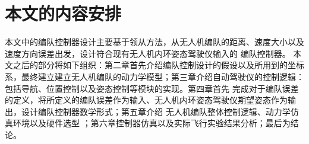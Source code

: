 \section{本文的内容安排}
本文中的编队控制器设计主要基于领从方法，从无人机编队的距离、速度大小以及速度方向误差出发，设计符合现有无人机内环姿态驾驶仪输入的
编队控制器。
本文之后的部分将如下组织：第二章首先介绍编队控制设计的假设以及所用到的坐标系，最终建立建立无人机编队的动力学模型；第三章介绍自动驾驶仪的控制逻辑：包括导航、位置控制以及姿态控制等模块的实现。第四章首先
完成对于编队误差的定义，将所定义的编队误差作为输入、无人机内环姿态驾驶仪期望姿态作为输出，设计编队控制器数学形式；第五章介绍
无人机编队整体控制逻辑、动力学仿真环境以及硬件选型 ；第六章控制器仿真以及实际飞行实验结果分析；最后为结论。

